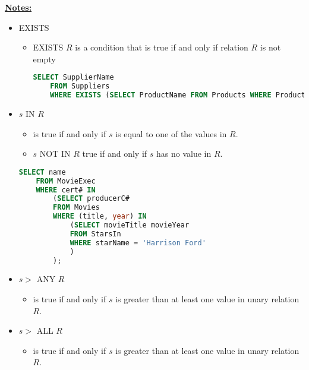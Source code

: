 \documentclass[12pt]{article}
\begin{document}
\begin{enumerate}[1.]
\begin{enumerate}[a)]
    \end{enumerate}

    \underline{\textbf{Notes:}}

    \bigskip

    \begin{itemize}
        \item EXISTS
        \begin{itemize}
            \item EXISTS $R$ is a condition that is true if and only if relation $R$ is not empty

            \bigskip

    \begin{lstlisting}[language=SQL]
    SELECT SupplierName
    FROM Suppliers
    WHERE EXISTS (SELECT ProductName FROM Products WHERE Products.SupplierID = Suppliers.supplierID AND Price = 22);
    \end{lstlisting}

        \end{itemize}

        \item $s$ IN $R$
        \begin{itemize}
            \item is true if and only if $s$ is equal to one of the values in $R$.
            \item $s$ NOT IN $R$ true if and only if $s$ has no value in $R$.
        \end{itemize}

    \begin{lstlisting}[language=SQL]
    SELECT name
    FROM MovieExec
    WHERE cert# IN
        (SELECT producerC#
        FROM Movies
        WHERE (title, year) IN
            (SELECT movieTitle movieYear
            FROM StarsIn
            WHERE starName = 'Harrison Ford'
            )
        );
    \end{lstlisting}

        \item $s >$ ANY $R$
        \begin{itemize}
            \item is true if and only if $s$ is greater than at least one value in
            unary relation $R$.
        \end{itemize}

        \item $s >$ ALL $R$
        \begin{itemize}
            \item is true if and only if $s$ is greater than at least one value in unary
            relation $R$.
        \end{itemize}
    \end{itemize}
\end{enumerate}
\end{document}

